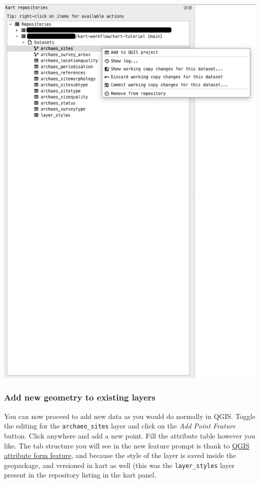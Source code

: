 \documentclass[
  letterpaper,
  DIV=11,
  numbers=noendperiod]{scrartcl}
\begin{document}
\begin{center}
\includegraphics{img/kart-panel-add-project.png}
\end{center}

\subsubsection{Add new geometry to existing layers}\label{sec-add-geom}

You can now proceed to add new data as you would do normally in QGIS.
Toggle the editing for the \texttt{archaeo\_sites} layer and click on
the \emph{Add Point Feature} button. Click anywhere and add a new point.
Fill the attribute table however you like. The tab structure you will
see in the new feature prompt is thank to
\href{https://docs.qgis.org/3.34/en/docs/user_manual/working_with_vector/vector_properties.html\#attributes-form-properties}{QGIS
attribute form feature}, and because the style of the layer is saved
inside the geopackage, and versioned in kart as well (this was the
\texttt{layer\_styles} layer present in the repository listing in the
kart panel.
\end{document}

